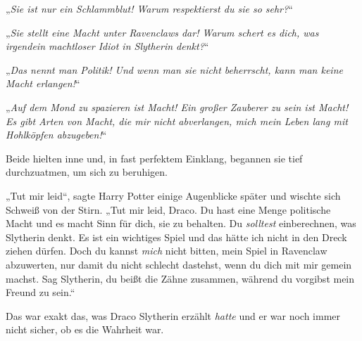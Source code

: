 „\emph{Sie ist nur ein Schlammblut! Warum respektierst du sie so sehr?}“

„\emph{Sie stellt eine Macht unter Ravenclaws dar! Warum schert es dich, was irgendein machtloser Idiot in Slytherin denkt?}“

„\emph{Das nennt man Politik! Und wenn man sie nicht beherrscht, kann man keine Macht erlangen!}“

„\emph{Auf dem Mond zu spazieren ist Macht! Ein großer Zauberer zu sein ist Macht! Es gibt Arten von Macht, die mir nicht abverlangen, mich mein Leben lang mit Hohlköpfen abzugeben!}“

Beide hielten inne und, in fast perfektem Einklang, begannen sie tief durchzuatmen, um sich zu beruhigen.

„Tut mir leid“, sagte Harry Potter einige Augenblicke später und wischte sich Schweiß von der Stirn. „Tut mir leid, Draco. Du hast eine Menge politische Macht und es macht Sinn für dich, sie zu behalten. Du \emph{solltest} einberechnen, was Slytherin denkt. Es ist ein wichtiges Spiel und das hätte ich nicht in den Dreck ziehen dürfen. Doch du kannst \emph{mich} nicht bitten, mein Spiel in Ravenclaw abzuwerten, nur damit du nicht schlecht dastehst, wenn du dich mit mir gemein machst. Sag Slytherin, du beißt die Zähne zusammen, während du vorgibst mein Freund zu sein.“

Das war exakt das, was Draco Slytherin erzählt \emph{hatte} und er war noch immer nicht sicher, ob es die Wahrheit war.

